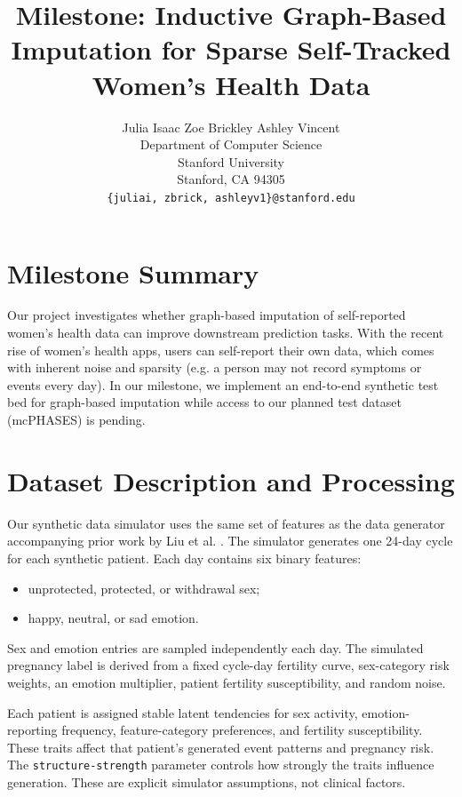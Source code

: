 \documentclass[11pt]{article}
\title{Milestone: Inductive Graph-Based Imputation for Sparse Self-Tracked Women's Health Data}
\author{%
  Julia Isaac \quad Zoe Brickley \quad Ashley Vincent \\
  Department of Computer Science \\
  Stanford University \\
  Stanford, CA 94305 \\
  \texttt{\{juliai, zbrick, ashleyv1\}@stanford.edu} \\
}
\date{}
\begin{document}
\maketitle

\section{Milestone Summary}
Our project investigates whether graph-based imputation of self-reported
women's health data can improve downstream prediction tasks. With the
recent rise of women's health apps, users can self-report their own data,
which comes with inherent noise and sparsity (e.g. a person may not record symptoms
or events every day). In our milestone, we implement an end-to-end synthetic test bed for graph-based
imputation while access to our planned test dataset (mcPHASES) is pending.

\section{Dataset Description and Processing}
Our synthetic data simulator uses the same set of features as the data
generator accompanying prior work by Liu et al. \cite{liu2019pregnancy}.
The simulator generates one 24-day cycle for each synthetic patient. Each
day contains six binary features:
\begin{itemize}
    \item unprotected, protected, or withdrawal sex;
    \item happy, neutral, or sad emotion.
\end{itemize}
Sex and emotion entries are sampled independently each day. The simulated
pregnancy label is derived from a fixed cycle-day fertility curve,
sex-category risk weights, an emotion multiplier, patient fertility
susceptibility, and random noise.

Each patient is assigned stable latent tendencies for sex activity,
emotion-reporting frequency, feature-category preferences, and fertility
susceptibility. These traits affect that patient's generated event
patterns and pregnancy risk. The \texttt{structure-strength} parameter
controls how strongly the traits influence generation. These are explicit
simulator assumptions, not clinical factors.
\end{document}
